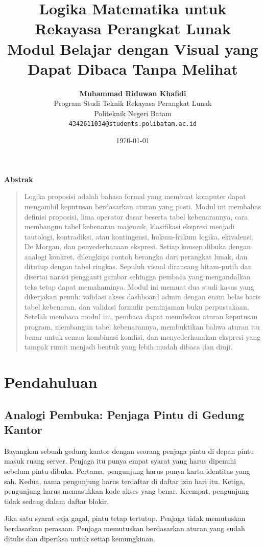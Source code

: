 \documentclass[11pt,a4paper]{article}
\title{\vspace{-1.5cm}\textbf{\sffamily\LARGE Logika Matematika untuk Rekayasa Perangkat Lunak\\ Modul Belajar dengan Visual yang Dapat Dibaca Tanpa Melihat}}
\author{
	\textbf{Muhammad Riduwan Khafidi} \\
	\small Program Studi Teknik Rekayasa Perangkat Lunak \\
	\small Politeknik Negeri Batam \\
	\small \texttt{4342611034@students.polibatam.ac.id}
}
\date{\small\today}
\renewenvironment{abstract}
{\small
	\begin{center}\textbf{\sffamily Abstrak}\end{center}
	\begin{quote}}
	{\end{quote}}
\begin{document}
\maketitle
\thispagestyle{empty}

\begin{abstract}
	Logika proposisi adalah bahasa formal yang membuat komputer dapat mengambil keputusan berdasarkan aturan yang pasti. Modul ini membahas definisi proposisi, lima operator dasar beserta tabel kebenarannya, cara membangun tabel kebenaran majemuk, klasifikasi ekspresi menjadi tautologi, kontradiksi, atau kontingensi, hukum-hukum logika, ekivalensi, De Morgan, dan penyederhanaan ekspresi. Setiap konsep dibuka dengan analogi konkret, dilengkapi contoh berangka dari perangkat lunak, dan ditutup dengan tabel ringkas. Sepuluh visual dirancang hitam-putih dan disertai narasi pengganti gambar sehingga pembaca yang mengandalkan teks tetap dapat memahaminya. Modul ini memuat dua studi kasus yang dikerjakan penuh: validasi akses dashboard admin dengan enam belas baris tabel kebenaran, dan validasi formulir peminjaman buku perpustakaan. Setelah membaca modul ini, pembaca dapat menuliskan aturan keputusan program, membangun tabel kebenarannya, membuktikan bahwa aturan itu benar untuk semua kombinasi kondisi, dan menyederhanakan ekspresi yang tampak rumit menjadi bentuk yang lebih mudah dibaca dan diuji.
\end{abstract}

\section{Pendahuluan}

\subsection{Analogi Pembuka: Penjaga Pintu di Gedung Kantor}

Bayangkan sebuah gedung kantor dengan seorang penjaga pintu di depan pintu masuk ruang server. Penjaga itu punya empat syarat yang harus dipenuhi sebelum pintu dibuka. Pertama, pengunjung harus punya kartu identitas yang sah. Kedua, nama pengunjung harus terdaftar di daftar izin hari itu. Ketiga, pengunjung harus memasukkan kode akses yang benar. Keempat, pengunjung tidak sedang dalam daftar blokir.

Jika satu syarat saja gagal, pintu tetap tertutup. Penjaga tidak memutuskan berdasarkan perasaan. Penjaga memutuskan berdasarkan aturan yang sudah ditulis dan diperiksa untuk setiap kemungkinan.
\end{document}
